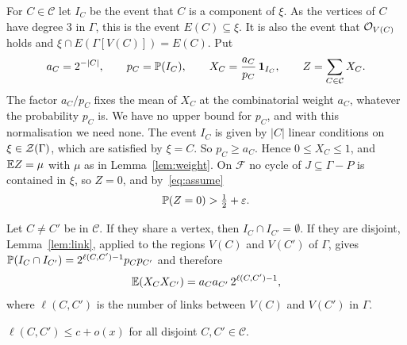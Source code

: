 For $C\in\mathcal{C}$ let $I_C$ be the event that $C$ is a component of $\xi$. As the vertices of
$C$ have degree $3$ in $\Gamma$, this is the event $E(C)\subseteq\xi$. It is also the event that
$\mathcal{O}_{V(C)}$ holds and $\xi\cap E(\Gamma[V(C)])=E(C)$. Put
\[
  a_C=2^{-|C|},\qquad p_C=\mathbb{P}(I_C),\qquad X_C=\frac{a_C}{p_C}\,\mathbf{1}_{I_C},\qquad
  Z=\sum_{C\in\mathcal{C}}X_C .
\]
The factor $a_C/p_C$ fixes the mean of $X_C$ at the combinatorial weight $a_C$, whatever the
probability $p_C$ is. We have no upper bound for $p_C$, and with this normalisation we need none.
The event $I_C$ is given by
$|C|$ linear conditions on $\xi\in\mathcal{Z}(\Gamma)$, which are satisfied by $\xi=C$. So $p_C\ge a_C$.
Hence $0\le X_C\le1$, and $\mathbb{E} Z=\mu$ with $\mu$ as in Lemma~\ref{lem:weight}. On $\mathcal{F}$
no cycle of $J\subseteq\Gamma-P$ is contained in $\xi$, so $Z=0$, and by~\eqref{eq:assume}
\begin{equation}\label{eq:Zzero}
  \mathbb{P}(Z=0)>\tfrac12+\varepsilon .
\end{equation}

Let $C\ne C'$ be in $\mathcal{C}$. If they share a vertex, then $I_C\cap I_{C'}=\emptyset$. If they
are disjoint, Lemma~\ref{lem:link}, applied to the regions $V(C)$ and $V(C')$ of $\Gamma$, gives
$\mathbb{P}(I_C\cap I_{C'})=2^{\ell(C,C')-1}p_Cp_{C'}$ and therefore
\begin{equation}\label{eq:pair}
  \mathbb{E}(X_CX_{C'})=a_Ca_{C'}\,2^{\ell(C,C')-1},
\end{equation}
where $\ell(C,C')$ is the number of links between $V(C)$ and $V(C')$ in $\Gamma$.

\begin{lemma}\label{lem:links}
$\ell(C,C')\le c+o(x)$ for all disjoint $C,C'\in\mathcal{C}$.
\end{lemma}

